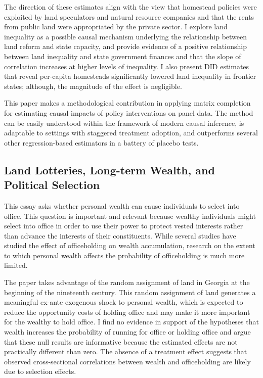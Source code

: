 The direction of these estimates align with the view that homestead policies were exploited by land speculators and natural resource companies and that the rents from public land were appropriated by the private sector. I explore land inequality as a possible causal mechanism underlying the relationship between land reform and state capacity, and provide evidence of a positive relationship between land inequality and state government finances and that the slope of correlation increases at higher levels of inequality. I also present DID estimates that reveal per-capita homesteads significantly lowered land inequality in frontier states; although, the magnitude of the effect is negligible. 

This paper makes a methodological contribution in applying matrix completion for estimating causal impacts of policy interventions on panel data. The method can be easily understood within the framework of modern causal inference, is adaptable to settings with staggered treatment adoption, and outperforms several other regression-based estimators in a battery of placebo tests.

\subsection{Land Lotteries, Long-term Wealth, and Political Selection} 
This essay asks whether personal wealth can cause individuals to select into office. This question is important and relevant because wealthy individuals might select into office in order to use their power to protect vested interests rather than advance the interests of their constituents. While several studies have studied the effect of officeholding on wealth accumulation, research on the extent to which personal wealth affects the probability of officeholding is much more limited.

The paper takes advantage of the random assignment of land in Georgia at the beginning of the nineteenth century. This random assignment of land generates a meaningful ex-ante exogenous shock to personal wealth, which is expected to reduce the opportunity costs of holding office and may make it more important for the wealthy to hold office. I find no evidence in support of the hypotheses that wealth increases the probability of running for office or holding office and argue that these null results are informative because the estimated effects are not practically different than zero. The absence of a treatment effect suggests that observed cross-sectional correlations between wealth and officeholding are likely due to selection effects. 

